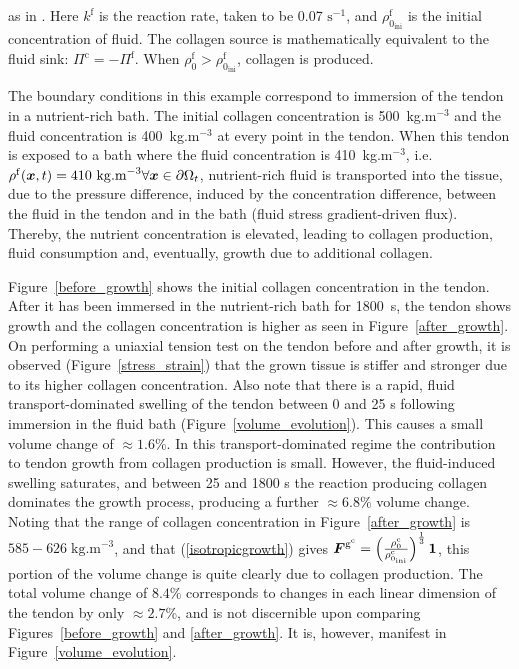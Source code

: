 \noindent as in \citet{growthpaper}. Here $k^\mathrm{f}$ is the
reaction rate, taken to be 0.07 $\mathrm{s}^{-1}$, and
$\rho_{0_\mathrm{ini}}^\mathrm{f}$ is the initial 
concentration of fluid. The collagen
source is mathematically equivalent to the fluid sink: $\Pi^\mathrm{c} =
-\Pi^\mathrm{f}$. When $\rho_{0}^\mathrm{f} >
\rho_{0_\mathrm{ini}}^\mathrm{f}$, collagen is produced.

The boundary conditions in this example correspond to immersion of the
tendon in a nutrient-rich bath. The initial collagen concentration is
500~kg.m$^{-3}$ and the fluid concentration is 400~kg.m$^{-3}$ at
every point in the tendon. When this tendon is exposed to a bath
where the fluid concentration is 410~kg.m$^{-3}$,
i.e. $\rho^\mathrm{f}(\mbox{\boldmath$ x$},t)=410~\mathrm{kg.m}^{-3} \forall \mbox{\boldmath$ x$} \in
\partial\Omega_t$, nutrient-rich fluid is transported into the tissue,
due to the pressure difference, induced by the concentration
difference, between the fluid in the tendon and in 
the bath (fluid stress gradient-driven flux). Thereby, the nutrient
concentration is elevated, leading to collagen production, fluid
consumption and, eventually, growth due to additional collagen. 

Figure~\ref{before_growth} shows the initial collagen concentration in
the tendon. After it has been immersed in the nutrient-rich bath for
1800~s, the tendon shows growth and the collagen concentration is
higher as seen in Figure~\ref{after_growth}. On performing a
uniaxial tension test on the tendon before and after growth, it is
observed (Figure~\ref{stress_strain}) that the grown tissue is stiffer
and stronger due to its higher collagen concentration. Also note that
there is a rapid, fluid transport-dominated swelling 
of the tendon  between 0 and 25 s 
following immersion in the fluid bath
(Figure~\ref{volume_evolution}). This causes a small volume change of 
$\approx 1.6$\%. In this transport-dominated regime the contribution
to tendon growth from collagen production is small. However, the
fluid-induced swelling saturates, and between
25 and 1800 s the reaction producing collagen dominates the growth
process, producing a further $\approx 6.8$\% volume change. Noting that the
range of collagen concentration in Figure~\ref{after_growth} is
$585-626\; \mbox{kg.m}^{-3}$, and that (\ref{isotropicgrowth}) gives $\mbox{\boldmath$ F$}^{\mathrm{g}^\mathrm{c}} = \left(
  \frac{\rho_0^\mathrm{c}}{\rho_{0_{\mathrm{ini}}}^\mathrm{c}}
  \right)^  {\frac{1}{3}} {\bf 1}$, this portion of the volume change
  is quite clearly due to collagen production. The total volume change
  of $8.4$\% corresponds to changes in each linear dimension of the
  tendon by only $\approx 2.7$\%, and is not discernible upon comparing
  Figures~\ref{before_growth} and \ref{after_growth}. It is, however,
  manifest in Figure~\ref{volume_evolution}.


